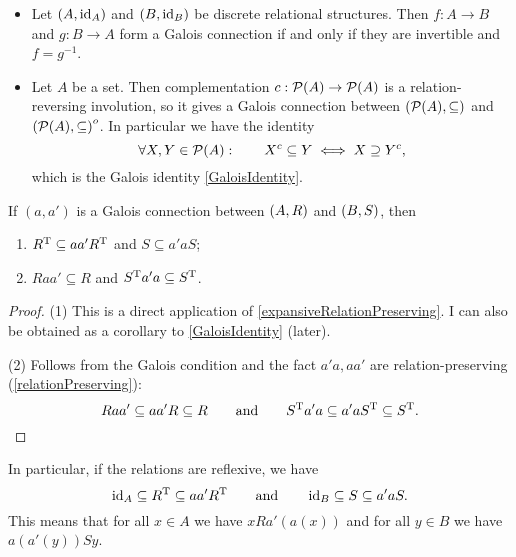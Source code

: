 \begin{example}
\begin{itemize}
\item Let $\sSet{A, \id_A}$ and $\sSet{B, \id_B}$ be discrete relational structures. Then $f: A\to B$ and $g: B \to A$ form a Galois connection if and only if they are invertible and $f = g^{-1}$.
\item Let $A$ be a set. Then complementation $c: \operatorname{\mathcal{P}}(A) \to \operatorname{\mathcal{P}}(A)$ is a relation-reversing involution, so it gives a Galois connection between $\sSet{\powerset(A), \subseteq}$ and $\sSet{\powerset(A), \subseteq}^o$. In particular we have the identity
\[ \forall X, Y\in\operatorname{\mathcal{P}}(A): \qquad X^c \subseteq Y \iff X \supseteq Y^c, \]
which is the Galois identity \ref{GaloisIdentity}.
\end{itemize}
\end{example}

\begin{lemma} \label{immediateGaloisCorollaries}
If $(a,a')$ is a Galois connection between $\sSet{A,R}$ and $\sSet{B,S}$, then
\begin{enumerate}
\item $R^{\mathrm{T}} \subseteq aa'R^{\mathrm{T}}$ and $S \subseteq a'aS$;
\item $Raa' \subseteq R$ and $S^{\mathrm{T}} a'a \subseteq S^{\mathrm{T}}$.
\end{enumerate}
\end{lemma}
\begin{proof}
(1) This is a direct application of \ref{expansiveRelationPreserving}. I can also be obtained as a corollary to \ref{GaloisIdentity} (later).

(2) Follows from the Galois condition and the fact $a'a, aa'$ are relation-preserving (\ref{relationPreserving}):
\[ Raa' \subseteq aa'R \subseteq R \qquad\text{and}\qquad S^{\mathrm{T}} a'a \subseteq a'aS^{\mathrm{T}} \subseteq S^{\mathrm{T}}. \]
\end{proof}

In particular, if the relations are reflexive, we have
\[ \operatorname{id}_A \subseteq R^{\mathrm{T}} \subseteq aa'R^{\mathrm{T}} \qquad\text{and}\qquad \operatorname{id}_B \subseteq S \subseteq a'aS. \]
This means that for all $x\in A$ we have $ xRa'(a(x))$ and for all $y\in B$ we have $a(a'(y))Sy$.

